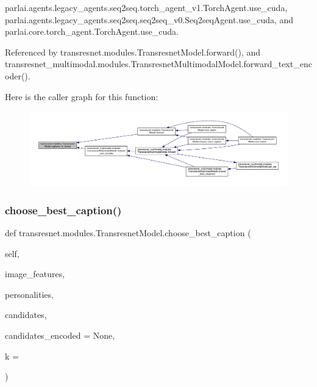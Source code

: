 parlai.\+agents.\+legacy\+\_\+agents.\+seq2seq.\+torch\+\_\+agent\+\_\+v1.\+Torch\+Agent.\+use\+\_\+cuda, parlai.\+agents.\+legacy\+\_\+agents.\+seq2seq.\+seq2seq\+\_\+v0.\+Seq2seq\+Agent.\+use\+\_\+cuda, and parlai.\+core.\+torch\+\_\+agent.\+Torch\+Agent.\+use\+\_\+cuda.



Referenced by transresnet.\+modules.\+Transresnet\+Model.\+forward(), and transresnet\+\_\+multimodal.\+modules.\+Transresnet\+Multimodal\+Model.\+forward\+\_\+text\+\_\+encoder().

Here is the caller graph for this function\+:
\nopagebreak
\begin{figure}[H]
\begin{center}
\leavevmode
\includegraphics[width=350pt]{classtransresnet_1_1modules_1_1TransresnetModel_a6d8ed65c210d4ab0a665ba305257c3d6_icgraph}
\end{center}
\end{figure}
\mbox{\label{classtransresnet_1_1modules_1_1TransresnetModel_a9db8fd3e6b80ef4f17a9975673e46d01}} 
\subsubsection{\texorpdfstring{choose\+\_\+best\+\_\+caption()}{choose\_best\_caption()}}
{\footnotesize\ttfamily def transresnet.\+modules.\+Transresnet\+Model.\+choose\+\_\+best\+\_\+caption (\begin{DoxyParamCaption}\item[{}]{self,  }\item[{}]{image\+\_\+features,  }\item[{}]{personalities,  }\item[{}]{candidates,  }\item[{}]{candidates\+\_\+encoded = {\ttfamily None},  }\item[{}]{k = {} }\end{DoxyParamCaption})}

